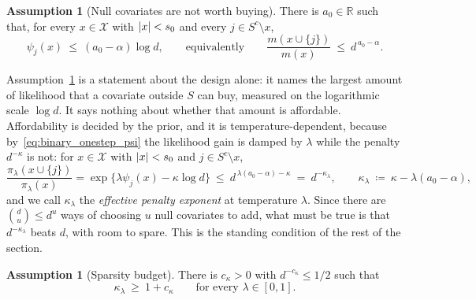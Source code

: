 \documentclass[aos]{imsart}%
\DeclarePairedDelimiter{\abs}{\lvert}{\rvert}
\newcommand{\ambientspace}[0]{\mathcal{X}}
\newcommand{\bbR}[0]{\mathbb{R}}
\theoremstyle{plain}
\theoremstyle{definition}
\newtheorem{assumption}[theorem]{Assumption}
\begin{document}
    \begin{assumption}[Null covariates are not worth buying]
        \label{ass:binary_null}
        There is $a_0\in\bbR$ such that, for every $x\in\ambientspace$
        with $\abs x<s_0$ and every $j\in S^{c}\setminus x$,
        \begin{equation}
            \label{eq:binary_nullbound}
            \psi_j(x)\ \leq\ (a_0-\alpha)\log d,
            \qquad\text{equivalently}\qquad
            \frac{m(x\cup\{j\})}{m(x)}\ \leq\ d^{\,a_0-\alpha} .
        \end{equation}
    \end{assumption}

    Assumption~\ref{ass:binary_null} is a statement about the design alone: it
    names the largest amount of likelihood that a covariate outside $S$ can
    buy, measured on the logarithmic scale $\log d$. It says nothing about
    whether that amount is affordable. Affordability is decided by the prior,
    and it is temperature-dependent, because by~\eqref{eq:binary_onestep_psi}
    the likelihood gain is damped by $\lambda$ while the penalty $d^{-\kappa}$
    is not: for $x\in\ambientspace$ with $\abs x<s_0$ and
    $j\in S^{c}\setminus x$,
    \begin{equation}
        \label{eq:binary_kappalambda}
        \frac{\pi_\lambda(x\cup\{j\})}{\pi_\lambda(x)}
        =\exp\bigl\{\lambda\psi_j(x)-\kappa\log d\bigr\}
        \ \leq\ d^{\,\lambda(a_0-\alpha)-\kappa}
        \ =\ d^{-\kappa_\lambda},
        \qquad
        \kappa_\lambda\ \coloneq\ \kappa-\lambda(a_0-\alpha),
    \end{equation}
    and we call $\kappa_\lambda$ the \emph{effective penalty exponent} at
    temperature $\lambda$. Since there are $\binom du\leq d^{u}$ ways of
    choosing $u$ null covariates to add, what must be true is that
    $d^{-\kappa_\lambda}$ beats $d$, with room to spare. This is the standing
    condition of the rest of the section.

    \begin{assumption}[Sparsity budget]
        \label{ass:binary_budget}
        There is $c_\kappa>0$ with $d^{-c_\kappa}\leq1/2$ such that
        \begin{equation}
            \label{eq:binary_budget}
            \kappa_\lambda\ \geq\ 1+c_\kappa
            \qquad\text{for every }\lambda\in[0,1].
        \end{equation}
    \end{assumption}
\end{document}
